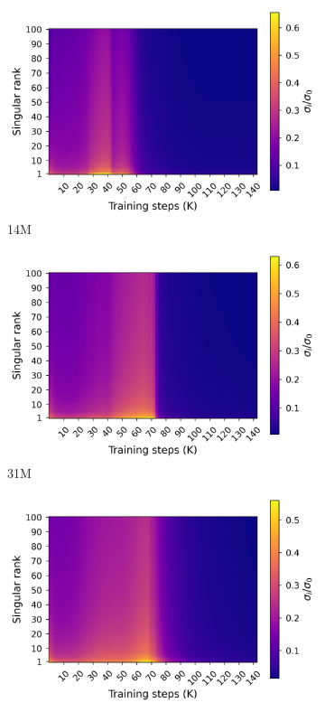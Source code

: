 \begin{figure}[h]
    \centering
    \begin{subfigure}{0.32\columnwidth}
         \includegraphics[width=\linewidth]{sources/part_1/softmax_bottleneck/imgs/sv_map_14m.png}
         \caption{14M}
         \label{fig:sv_14M}
    \end{subfigure}
    \begin{subfigure}{0.32\columnwidth}
         \includegraphics[width=\linewidth]{sources/part_1/softmax_bottleneck/imgs/sv_map_31m.png}
         \caption{31M}
         \label{fig:sv_31M}
    \end{subfigure}
    \begin{subfigure}{0.32\columnwidth}
         \includegraphics[width=\linewidth]{sources/part_1/softmax_bottleneck/imgs/sv_map_70m.png}

\end{subfigure}
\end{figure}
